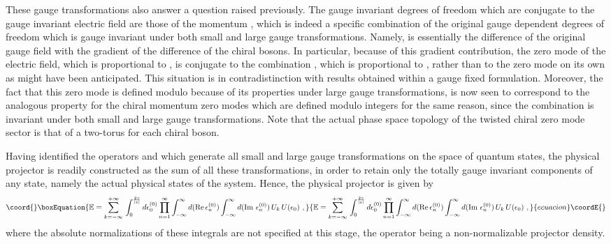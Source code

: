 \documentclass[a4paper,11pt]{article}
\def\proj{\mathbb E}
\begin{document}
These gauge transformations also answer a question raised pre\-vious\-ly.
The gauge invariant degrees of freedom which are conjugate to the gauge 
invariant electric field are those of the momentum \coordHE{}, which 
is indeed a specific combination of the original gauge dependent degrees of 
freedom which is gauge invariant under both small and large gauge
transformations. Namely, \coordHE{} is essentially the difference of 
the original gauge field \coordHE{} with the gradient 
\coordHE{} of the difference of the chiral bosons.
In particular, because of this gradient contribution, the zero mode of the
electric field, which is proportional to \coordHE{},
is conjugate to the combination \coordHE{}, 
which is proportional to \coordHE{}, rather than to
the \coordHE{} zero mode \coordHE{} on its own as might have been anticipated. 
This situation is in contradistinction with results obtained within a gauge 
fixed formulation.\cite{Manton,Hetrick} Moreover, the fact that this zero mode 
\coordHE{} is defined modulo \coordHE{} because of its properties
under large gauge transformations, is now seen to correspond to the
analogous property for the chiral momentum zero modes \coordHE{} which
are defined modulo integers for the same reason, since the combination
\coordHE{} is invariant under both small and large
gauge transformations. Note that the actual phase space topology of the 
twisted chiral zero mode sector \coordHE{} is that of a two-torus for 
each chiral boson.

Having identified the operators \coordHE{} and \coordHE{} which generate
all small and large gauge transformations on the space of quantum states,
the physical projector is readily constructed as the sum of all these
transformations,\cite{Klauder} in order to retain only the totally gauge 
invariant components of any state,\cite{Gov1} namely the actual physical 
states of the system. Hence, the physical projector is given by
\begin{equation}\coord{}\boxEquation{
\proj=\sum_{k=-\infty}^{+\infty}\,\int_0^{\frac{2\pi}{|e|}}d\epsilon^{(0)}_0
\prod_{n=1}^\infty\int_{-\infty}^\infty d({\rm Re}\,\epsilon^{(0)}_n)
\int_{-\infty}^\infty d({\rm Im}\ \epsilon^{(0)}_n)\,
U_k\,U(\epsilon_0)\ ,
}{
\proj=\sum_{k=-\infty}^{+\infty}\,\int_0^{\frac{2\pi}{|e|}}d\epsilon^{(0)}_0
\prod_{n=1}^\infty\int_{-\infty}^\infty d({\rm Re}\,\epsilon^{(0)}_n)
\int_{-\infty}^\infty d({\rm Im}\ \epsilon^{(0)}_n)\,
U_k\,U(\epsilon_0)\ ,
}{ecuacion}\coordE{}\end{equation}
where the absolute normalizations of these integrals are not specified
at this stage, the operator \myHighlight{$\proj$}\coordHE{} being a non-normalizable projector density.
\end{document}
